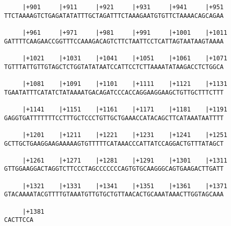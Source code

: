 \documentclass{article}
\begin{document}
\begin{Verbatim}
     |+901     |+911     |+921     |+931     |+941     |+951
TTCTAAAAGTCTGAGATATATTTGCTAGATTTCTAAAGAATGTGTTCTAAAACAGCAGAA
                                                            
     |+961     |+971     |+981     |+991     |+1001    |+1011
GATTTTCAAGAACCGGTTTCCAAAGACAGTCTTCTAATTCCTCATTAGTAATAAGTAAAA
                                                            
     |+1021    |+1031    |+1041    |+1051    |+1061    |+1071
TGTTTATTGTTGTAGCTCTGGTATATAATCCATTCCTCTTAAAATATAAGACCTCTGGCA
                                                            
     |+1081    |+1091    |+1101    |+1111    |+1121    |+1131
TGAATATTTCATATCTATAAAATGACAGATCCCACCAGGAAGGAAGCTGTTGCTTTCTTT
                                                            
     |+1141    |+1151    |+1161    |+1171    |+1181    |+1191
GAGGTGATTTTTTTCCTTTGCTCCCTGTTGCTGAAACCATACAGCTTCATAAATAATTTT
                                                            
     |+1201    |+1211    |+1221    |+1231    |+1241    |+1251
GCTTGCTGAAGGAAGAAAAAGTGTTTTTCATAAACCCATTATCCAGGACTGTTTATAGCT
                                                            
     |+1261    |+1271    |+1281    |+1291    |+1301    |+1311
GTTGGAAGGACTAGGTCTTCCCTAGCCCCCCCAGTGTGCAAGGGCAGTGAAGACTTGATT
                                                            
     |+1321    |+1331    |+1341    |+1351    |+1361    |+1371
GTACAAAATACGTTTTGTAAATGTTGTGCTGTTAACACTGCAAATAAACTTGGTAGCAAA
                                                            
     |+1381
CACTTCCA

        
\end{Verbatim}
\end{document}
